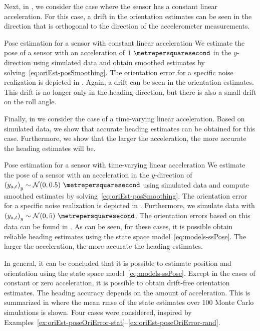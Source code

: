 Next, in , we consider the case where the sensor has a constant linear acceleration. For this case, a drift in the orientation estimates can be seen in the direction that is orthogonal to the direction of the accelerometer measurements.

\begin{myexample}{Pose estimation for a sensor with constant linear acceleration}
\label{ex:oriEst-poseOriError-const}
We estimate the pose of a sensor with an acceleration of $1~\metrepersquaresecond$ in the $y$-direction using simulated data and obtain smoothed estimates by solving~\eqref{eq:oriEst-posSmoothing}. The orientation error for a specific noise realization is depicted in . Again, a drift can be seen in the orientation estimates. This drift is no longer only in the heading direction, but there is also a small drift on the roll angle.  
\end{myexample}

Finally, in  we consider the case of a time-varying linear acceleration. Based on simulated data, we show that accurate heading estimates can be obtained for this case. Furthermore, we show that the larger the acceleration, the more accurate the heading estimates will be. 

\begin{myexample}{Pose estimation for a sensor with time-varying linear acceleration}
\label{ex:oriEst-poseOriError-rand}
We estimate the pose of a sensor with an acceleration in the $y$-direction of $\left( y_{\text{a},t} \right)_y \sim \mathcal{N}(0,0.5)~\metrepersquaresecond$ using simulated data and compute smoothed estimates by solving~\eqref{eq:oriEst-posSmoothing}. The orientation error for a specific noise realization is depicted in . Furthermore, we simulate data with $\left( y_{\text{a},t} \right)_y \sim \mathcal{N}(0,5)~\metrepersquaresecond$. The orientation errors based on this data can be found in . As can be seen, for these cases, it is possible obtain reliable heading estimates using the state space model~\eqref{eq:models-ssPose}. The larger the acceleration, the more accurate the heading estimates.
\end{myexample}

In general, it can be concluded that it is possible to estimate position and orientation using the state space model~\eqref{eq:models-ssPose}. Except in the cases of constant or zero acceleration, it is possible to obtain drift-free orientation estimates. The heading accuracy depends on the amount of acceleration. This is summarized in  where the mean \gls{rmse} of the state estimates over 100 Monte Carlo simulations is shown. Four cases were considered, inspired by Examples~\ref{ex:oriEst-poseOriError-stat}--\ref{ex:oriEst-poseOriError-rand}.

